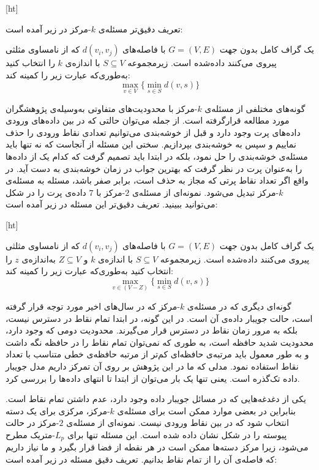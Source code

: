[ht]


تعریف دقیق‌تر مسئله‌ی $k$-مرکز در زیر آمده است:

یک گراف کامل بدون جهت $G = (V, E)$ با فاصله‌های $d(v_i, v_j)$ که از نامساوی مثلثی پیروی می‌کنند داده‌شده است. زیرمجموعه $S \subseteq V$ با اندازه‌ی $k$ را انتخاب کنید به‌طوری‌که عبارت زیر را کمینه کند:
$$\max_{v \in V} \{ \min_{s \in S} d(v, s) \}$$

گونه‌های مختلفی از مسئله‌ی $k$-مرکز با محدودیت‌های متفاوتی به‌وسیله‌ی پژوهشگران مورد مطالعه قرارگرفته است. از جمله می‌توان حالتی که در بین داده‌های ورودی داده‌های پرت وجود دارد و قبل از خوشه‌بندی می‌توانیم تعدادی نقاط ورودی را حذف نماییم و سپس به خوشه‌بندی بپردازیم. سختی این مسئله از آنجاست که نه تنها باید مسئله‌ی خوشه‌بندی را حل نمود، بلکه در ابتدا باید تصمیم گرفت که کدام یک از داده‌ها را به‌عنوان پرت در نظر گرفت که بهترین جواب در زمان خوشه‌بندی به دست آید. در واقع اگر تعداد نقاط پرتی که مجاز‌ به حذف است، برابر صفر باشد، مسئله به مسئله‌ی $k$-مرکز تبدیل می‌شود. نمونه‌ای از مسئله‌ی $2$-مرکز با $7$ داده‌ی پرت را در شکل  می‌توانید ببینید. تعریف دقیق‌تر این مسئله در زیر آمده است:

[ht]


یک گراف کامل بدون جهت $G = (V, E)$ با فاصله‌های $d(v_i, v_j)$ که از نامساوی مثلثی پیروی می‌کنند داده‌شده است. زیرمجموعه $S \subseteq V$ با اندازه‌ی $k$ و $Z \subseteq V$ به‌اندازه‌ی $z$ را انتخاب کنید به‌طوری‌که عبارت زیر را کمینه کند:
$$\max_{v \in (V - Z)} \{ \min_{s \in S} d(v, s) \}$$

گونه‌ای دیگری که در مسئله‌ی $k$-مرکز که در سال‌های اخیر مورد توجه قرار گرفته است، حالت جویبار داده‌ی آن است. در این گونه، در ابتدا تمام نقاط در دسترس نیست، بلکه به مرور زمان نقاط در دسترس قرار می‌گیرند. محدودیت دومی که وجود دارد، محدودیت شدید حافظه است، به طوری که نمی‌توان تمام نقاط را در حافظه نگه داشت و به طور معمول باید مرتبه‌ی حافظه‌ای کم‌تر از مرتبه حافظه‌ی خطی متناسب با تعداد نقاط استفاده نمود. مدلی که ما در این پژوهش بر روی آن تمرکز داریم مدل جویبار داده تک‌گذره است. یعنی تنها یک بار می‌توان از ابتدا تا انتهای داده‌ها را بررسی کرد.

یکی از دغدغه‌هایی که در مسائل جویبار داده وجود دارد، عدم داشتن تمام نقاط است. بنابراین در بعضی موارد ممکن است برای مسئله‌ی $k$-مرکز‌، مرکزی برای یک دسته انتخاب شود که در بین نقاط ورودی نیست. نمونه‌ای از مسئله‌ی $2$-مرکز در حالت پیوسته را در شکل‌  نشان داده شده است. این مسئله تنها برای $L_p$-متریک مطرح می‌شود، زیرا مرکز دسته‌ها ممکن است در هر نقطه از فضا قرار بگیرد و ما نیاز داریم که فاصله‌ی آن را از تمام نقاط بدانیم. تعریف دقیق‌ مسئله در زیر آمده است:

